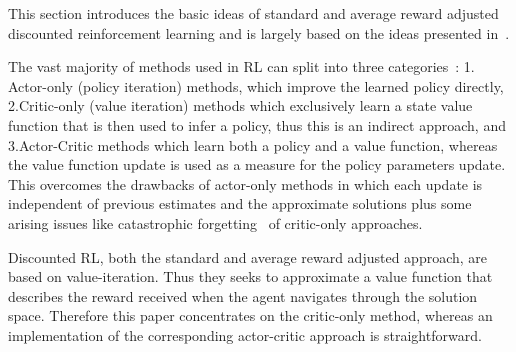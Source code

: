 \documentclass[envcountsame]{llncs}
\begin{document}
This section introduces the basic ideas of standard and average reward adjusted discounted
reinforcement learning and is largely based on the ideas presented
in~\cite{schneckenreither2020average}.

The vast majority of methods used in RL can split into three categories~\cite{konda2000actor}: 1.\@
Actor-only (policy iteration) methods, which improve the learned policy directly, 2.\@ Critic-only
(value iteration) methods which exclusively learn a state value function that is then used to infer
a policy, thus this is an indirect approach, and 3.\@ Actor-Critic methods which learn both a policy
and a value function, whereas the value function update is used as a measure for the policy
parameters update. This overcomes the drawbacks of actor-only methods in which each update is
independent of previous estimates and the approximate solutions plus some arising issues like
catastrophic forgetting~\cite{french1999catastrophic} of critic-only approaches.

Discounted RL, both the standard and average reward adjusted approach, are based on value-iteration.
Thus they seeks to approximate a value function that describes the reward received when the agent
navigates through the solution space. Therefore this paper concentrates on the critic-only method,
whereas an implementation of the corresponding actor-critic approach is straightforward.
\end{document}
